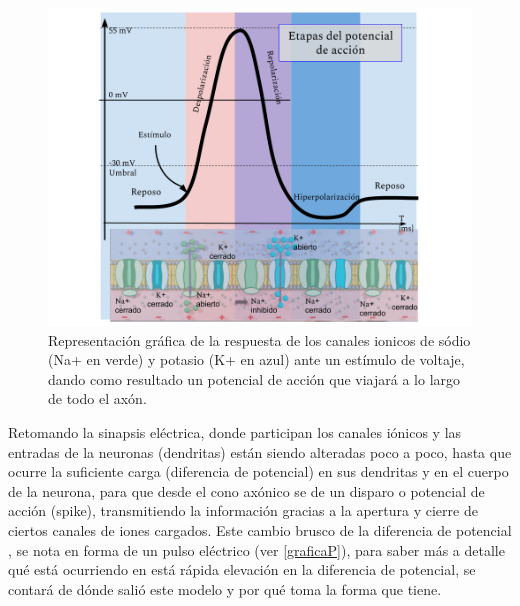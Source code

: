 \begin{figure}[h]
 \centering
 \includegraphics[scale=0.5]{../Figuras/Grafica.png}
 \caption{Representación gráfica de la respuesta de los canales ionicos de sódio (Na+ en verde) y potasio (K+ en azul) ante un estímulo de voltaje, dando como resultado un potencial de acción que viajará a lo largo de todo el axón.}
 \label{fig:graficaP}
\end{figure}

Retomando la sinapsis eléctrica, donde participan los canales iónicos y las entradas de la neuronas (dendritas) están siendo alteradas poco a poco, hasta que ocurre la suficiente carga (diferencia de potencial) en sus dendritas y en el cuerpo de la neurona, para que desde el cono axónico se de un disparo o potencial de acción (spike), transmitiendo la información gracias a la apertura y cierre de ciertos canales de iones cargados. Este cambio brusco de la diferencia de potencial , se nota en forma de un pulso eléctrico (ver \ref{graficaP}),  para saber más a detalle qué está ocurriendo en está rápida elevación en la diferencia de potencial, se contará de dónde salió este modelo y por qué toma la forma que tiene. 

